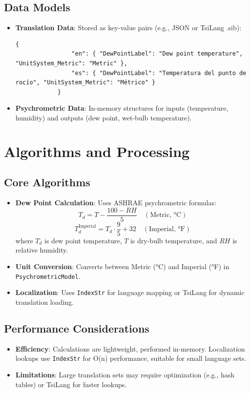 \documentclass[12pt,a4paper]{article}
\begin{document}
	\subsection{Data Models}
	\begin{itemize}
		\item \textbf{Translation Data}: Stored as key-value pairs (e.g., JSON or TsiLang .sib):
		\begin{lstlisting}[language=Delphi]
			{
				"en": { "DewPointLabel": "Dew point temperature", "UnitSystem_Metric": "Metric" },
				"es": { "DewPointLabel": "Temperatura del punto de rocío", "UnitSystem_Metric": "Métrico" }
			}
		\end{lstlisting}
		\item \textbf{Psychrometric Data}: In-memory structures for inputs (temperature, humidity) and outputs (dew point, wet-bulb temperature).
	\end{itemize}
	
	\section{Algorithms and Processing}
	\subsection{Core Algorithms}
	\begin{itemize}
		\item \textbf{Dew Point Calculation}: Uses ASHRAE psychrometric formulas:
		\begin{equation}
			T_d = T - \frac{100 - RH}{5} \quad (\text{Metric, °C})
		\end{equation}
		\begin{equation}
			T_d^\text{Imperial} = T_d \cdot \frac{9}{5} + 32 \quad (\text{Imperial, °F})
		\end{equation}
		where \( T_d \) is dew point temperature, \( T \) is dry-bulb temperature, and \( RH \) is relative humidity.
		\item \textbf{Unit Conversion}: Converts between Metric (°C) and Imperial (°F) in \texttt{PsychrometricModel}.
		\item \textbf{Localization}: Uses \texttt{IndexStr} for language mapping or TsiLang for dynamic translation loading.
	\end{itemize}
	
	\subsection{Performance Considerations}
	\begin{itemize}
		\item \textbf{Efficiency}: Calculations are lightweight, performed in-memory. Localization lookups use \texttt{IndexStr} for O(n) performance, suitable for small language sets.
		\item \textbf{Limitations}: Large translation sets may require optimization (e.g., hash tables) or TsiLang for faster lookups.
	\end{itemize}
	
\end{document}
